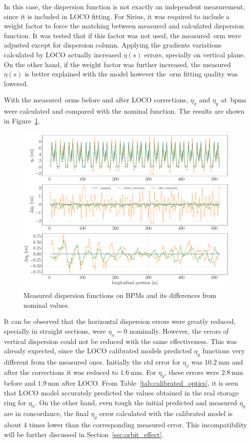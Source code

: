 In this case, the dispersion function is not exactly an independent measurement, since it is included in LOCO fitting. For Sirius, it was required to include a weight factor to force the matching between measured and calculated dispersion function. It was tested that if this factor was not used, the measured~\gls{orm} were adjusted except for dispersion column. Applying the gradients variations calculated by LOCO actually increased $\eta(s)$ errors, specially on vertical plane. On the other hand, if the weight factor was further increased, the measured $\eta(s)$ is better explained with the model however the~\gls{orm} fitting quality was lowered.

With the measured~\gls{orm}s before and after LOCO corrections, $\eta_x$ and $\eta_y$ at~\glspl{bpm} were calculated and compared with the nominal function. The results are shown in Figure~\ref{fig:disp_error}. 
\begin{figure}
\centering
\includegraphics[width=1.0\textwidth]{figures/dispersion_after_before_loco_legend.pdf}
\caption{Measured dispersion functions on BPMs and its differences from nominal values.}
\label{fig:disp_error}
\end{figure}

It can be observed that the horizontal dispersion errors were greatly reduced, specially in straight sections, were $\eta_x = 0$ nominally. However, the errors of vertical dispersion could not be reduced with the same effectiveness. This was already expected, since the LOCO calibrated models predicted $\eta_y$ functions very different from the measured ones. Initially the std error for $\eta_x$ was $\SI{10.2}{\milli\meter}$ and after the corrections it was reduced to $\SI{1.6}{\milli\meter}$. For $\eta_y$, these errors were $\SI{2.8}{\milli\meter}$ before and $\SI{1.9}{\milli\meter}$ after LOCO. From Table~\ref{tab:calibrated_optics}, it is seen that LOCO model accurately predicted the values obtained in the real storage ring for $\eta_x$. On the other hand, even tough the initial predicted and measured  $\eta_y$ are in concordance, the final $\eta_y$ error calculated with the calibrated model is about 4 times lower than the corresponding measured error. This incompatibility will be further discussed in Section~\ref{sec:orbit_effect}.

